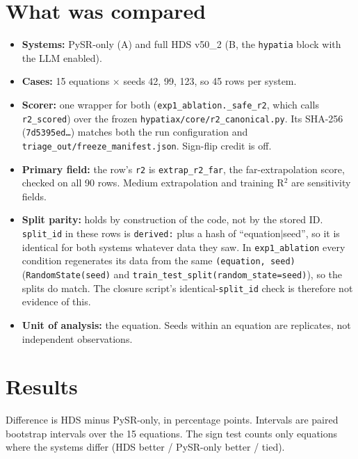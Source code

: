 \documentclass[11pt,a4paper]{article}
\newcommand{\code}[1]{\texttt{#1}}
\begin{document}
\section{What was compared}
\begin{itemize}
\item \textbf{Systems:} PySR-only (A) and full HDS v50\_2 (B, the \code{hypatia} block with the LLM enabled).
\item \textbf{Cases:} 15 equations $\times$ seeds 42, 99, 123, so 45 rows per system.
\item \textbf{Scorer:} one wrapper for both (\code{exp1\_ablation.\_safe\_r2}, which calls \code{r2\_scored}) over the frozen \code{hypatiax/core/r2\_canonical.py}. Its SHA-256 (\code{7d5395ed\ldots}) matches both the run configuration and \code{triage\_out/freeze\_manifest.json}. Sign-flip credit is off.
\item \textbf{Primary field:} the row's \code{r2} is \code{extrap\_r2\_far}, the far-extrapolation score, checked on all 90 rows. Medium extrapolation and training R$^2$ are sensitivity fields.
\item \textbf{Split parity:} holds by construction of the code, not by the stored ID. \code{split\_id} in these rows is \code{derived:} plus a hash of ``equation$|$seed'', so it is identical for both systems whatever data they saw. In \code{exp1\_ablation} every condition regenerates its data from the same \code{(equation, seed)} (\code{RandomState(seed)} and \code{train\_test\_split(random\_state=seed)}), so the splits do match. The closure script's identical-\code{split\_id} check is therefore not evidence of this.
\item \textbf{Unit of analysis:} the equation. Seeds within an equation are replicates, not independent observations.
\end{itemize}

\section{Results}
Difference is HDS minus PySR-only, in percentage points. Intervals are paired bootstrap intervals over the 15 equations. The sign test counts only equations where the systems differ (HDS better / PySR-only better / tied).
\end{document}

